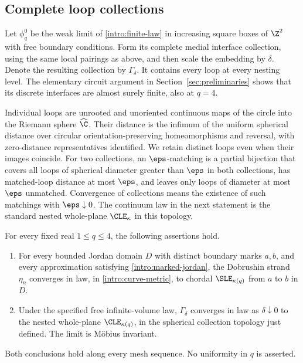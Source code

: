 \subsection{Complete loop collections}
\label{intro:collections}

Let $\phi_q^0$ be the weak limit of \eqref{intro:finite-law} in increasing
square boxes of $\Z^2$ with free boundary conditions.  Form its complete
medial interface collection, using the same local pairings as above, and
then scale the embedding by $\delta$.  Denote the resulting collection
by $\Gamma_\delta$.  It contains every loop at every nesting level.
The elementary circuit argument in Section~\ref{sec:preliminaries}
shows that its discrete interfaces are almost surely finite, also at
$q=4$.

Individual loops are unrooted and unoriented continuous maps of the
circle into the Riemann sphere $\widehat\C$.  Their distance is the
infimum of the uniform spherical distance over circular
orientation-preserving homeomorphisms and reversal, with zero-distance
representatives identified.  We retain distinct loops even when their
images coincide.  For two collections, an $\eps$-matching is a partial
bijection that covers all loops of spherical diameter greater than
$\eps$ in both collections, has matched-loop distance at most $\eps$,
and leaves only loops of diameter at most $\eps$ unmatched.  Convergence
of collections means the existence of such matchings with
$\eps\downarrow0$.  The continuum law in the next statement is the
standard nested whole-plane $\CLE_\kappa$ in this topology.

\begin{theorem}
\label{intro:main}
For every fixed real $1\le q\le4$, the following assertions hold.
\begin{enumerate}[label=\textup{(\roman*)}]
\item For every bounded Jordan domain $D$ with distinct boundary marks
$a,b$, and every approximation satisfying
\eqref{intro:marked-jordan}, the Dobrushin strand $\eta_n$ converges in
law, in \eqref{intro:curve-metric}, to chordal $\SLE_{\kappa(q)}$ from
$a$ to $b$ in $D$.
\item Under the specified free infinite-volume law,
$\Gamma_\delta$ converges in law as $\delta\downarrow0$ to the nested
whole-plane $\CLE_{\kappa(q)}$, in the spherical collection topology
just defined.  The limit is M\"obius invariant.
\end{enumerate}
Both conclusions hold along every mesh sequence.  No uniformity in $q$
is asserted.
\end{theorem}

